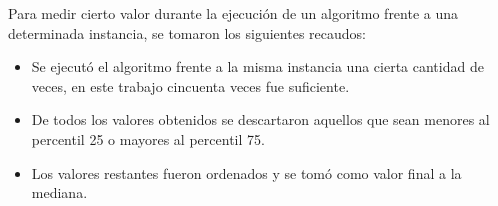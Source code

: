 Para medir cierto valor durante la ejecución de un algoritmo frente a una determinada instancia, se tomaron los siguientes recaudos:

\begin{itemize}
    \item Se ejecutó el algoritmo frente a la misma instancia una cierta cantidad de veces, en este trabajo cincuenta veces fue suficiente.
    \item De todos los valores obtenidos se descartaron aquellos que sean menores al percentil 25 o mayores al percentil 75.
    \item Los valores restantes fueron ordenados y se tomó como valor final a la mediana.
\end{itemize}
